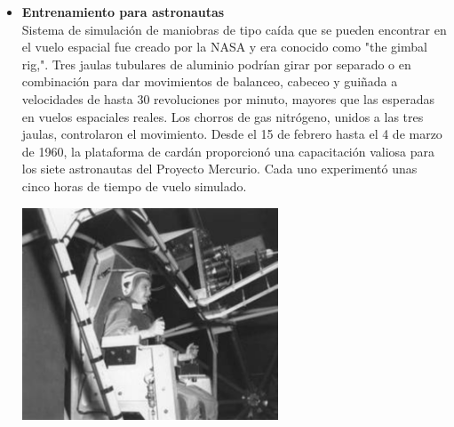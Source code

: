 \begin{itemize}
	\item \textbf{Entrenamiento para astronautas}\\
	      Sistema de simulación de maniobras de tipo caída que se pueden encontrar en el vuelo espacial
	      fue creado por la NASA y era conocido como "the gimbal rig,".
	      Tres jaulas tubulares de aluminio podrían girar por separado o en combinación para
	      dar movimientos de balanceo, cabeceo y guiñada a velocidades de hasta 30
	      revoluciones por minuto, mayores que las esperadas en vuelos espaciales reales.
	      Los chorros de gas nitrógeno, unidos a las tres jaulas, controlaron el movimiento.
	      Desde el 15 de febrero hasta el 4 de marzo de 1960, la plataforma de cardán
	      proporcionó una capacitación valiosa para los siete astronautas del Proyecto
	      Mercurio. Cada uno experimentó unas cinco horas de tiempo de vuelo simulado.\cite{WEB:MERCURY}
	      \begin{center}
		      \includegraphics[width=0.6\textwidth]{Contenido/Cuerpo/Capitulo1/Fig3.eps}
		      \label{fig:Introduccion:Fig4}
	      \end{center}


\end{itemize}
